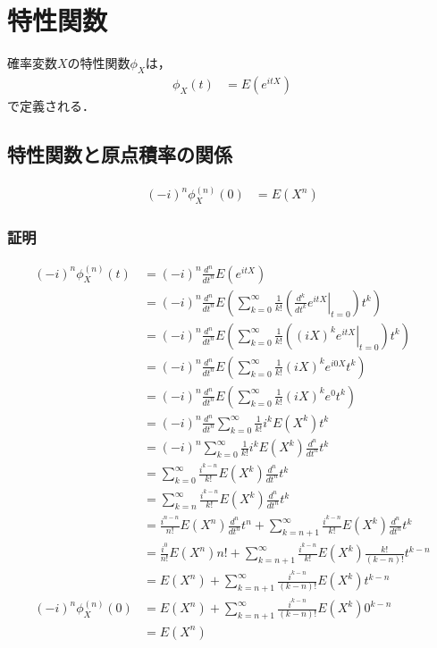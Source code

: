 \documentclass[dvipdfmx]{jsarticle}
\begin{document}
 \section{特性関数}
確率変数$X$の特性関数$\phi_X$は，
 \begin{align}
  \phi_X\left(t\right)&=E\left(e^{itX}\right)
 \end{align}
で定義される．
 \subsection{特性関数と原点積率の関係}
 \begin{align}
  \left(-i\right)^n\phi_X^{\left(n\right)}\left(0\right)&=E\left(X^n\right)
 \end{align}
 \subsubsection{証明}
 \begin{align}
  \left(-i\right)^n\phi_X^{\left(n\right)}\left(t\right)&=\left(-i\right)^n\frac{d^n}{dt^n}E\left(e^{itX}\right)\nonumber\\
  &=\left(-i\right)^n\frac{d^n}{dt^n}E\left(\sum_{k=0}^\infty\frac{1}{k!}\left(\left.\frac{d^k}{dt^k}e^{itX}\right|_{t=0}\right)t^k\right)\nonumber\\
  &=\left(-i\right)^n\frac{d^n}{dt^n}E\left(\sum_{k=0}^\infty\frac{1}{k!}\left(\left.\left(iX\right)^ke^{itX}\right|_{t=0}\right)t^k\right)\nonumber\\
  &=\left(-i\right)^n\frac{d^n}{dt^n}E\left(\sum_{k=0}^\infty\frac{1}{k!}\left(iX\right)^ke^{i0X}t^k\right)\nonumber\\
  &=\left(-i\right)^n\frac{d^n}{dt^n}E\left(\sum_{k=0}^\infty\frac{1}{k!}\left(iX\right)^ke^0t^k\right)\nonumber\\
  &=\left(-i\right)^n\frac{d^n}{dt^n}\sum_{k=0}^\infty\frac{1}{k!}i^kE\left(X^k\right)t^k\nonumber\\
  &=\left(-i\right)^n\sum_{k=0}^\infty\frac{1}{k!}i^kE\left(X^k\right)\frac{d^n}{dt^n}t^k\nonumber\\
  &=\sum_{k=0}^\infty\frac{i^{k-n}}{k!}E\left(X^k\right)\frac{d^n}{dt^n}t^k\nonumber\\
  &=\sum_{k=n}^\infty\frac{i^{k-n}}{k!}E\left(X^k\right)\frac{d^n}{dt^n}t^k\nonumber\\
  &=\frac{i^{n-n}}{n!}E\left(X^n\right)\frac{d^n}{dt^n}t^n+\sum_{k=n+1}^\infty\frac{i^{k-n}}{k!}E\left(X^k\right)\frac{d^n}{dt^n}t^k\nonumber\\
  &=\frac{i^0}{n!}E\left(X^n\right)n!+\sum_{k=n+1}^\infty\frac{i^{k-n}}{k!}E\left(X^k\right)\frac{k!}{\left(k-n\right)!}t^{k-n}\nonumber\\
  &=E\left(X^n\right)+\sum_{k=n+1}^\infty\frac{i^{k-n}}{\left(k-n\right)!}E\left(X^k\right)t^{k-n}\nonumber\\
  \left(-i\right)^n\phi_X^{\left(n\right)}\left(0\right)&=E\left(X^n\right)+\sum_{k=n+1}^\infty\frac{i^{k-n}}{\left(k-n\right)!}E\left(X^k\right)0^{k-n}\nonumber\\
  &=E\left(X^n\right)
 \end{align}
\end{document}
